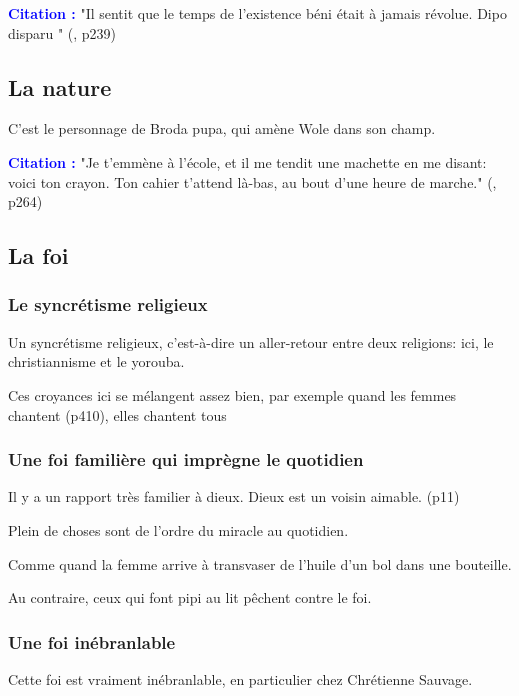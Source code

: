 \documentclass[a4paper, 11pt, hidelinks]{article}
\newcommand{\bs}{\bigskip}
\newcommand{\cit}{\large \textcolor{blue}{\textbf{Citation :}} \large }
\newcommand{\rb}[1]{\Romanbar{#1}}
\begin{document}
\cit "Il sentit que le temps de l'existence béni était à jamais révolue. Dipo disparu " (\rb{8}, p239)



\subsection{La nature}


C'est le personnage de Broda pupa, qui amène Wole dans son champ.

\cit "Je t'emmène à l'école, et il me tendit une machette en me disant: voici ton crayon. Ton cahier t'attend là-bas, au bout d'une heure de marche." (\rb{9}, p264)



\subsection{La foi}


\subsubsection{Le syncrétisme religieux}


Un syncrétisme religieux, c'est-à-dire un aller-retour entre deux religions: ici, le christiannisme et le yorouba.


Ces croyances ici se mélangent assez bien, par exemple quand les femmes chantent (p410), elles chantent tous





\subsubsection{Une foi familière qui imprègne le quotidien}


Il y a un rapport très familier à dieux. Dieux est un voisin aimable. (p11)
\bs


Plein de choses sont de l'ordre du miracle au quotidien.

Comme quand la femme arrive à transvaser de l'huile d'un bol dans une bouteille.
\bs


Au contraire, ceux qui font pipi au lit pêchent contre le foi.



\subsubsection{Une foi inébranlable}
Cette foi est vraiment inébranlable, en particulier chez Chrétienne Sauvage.
\end{document}

